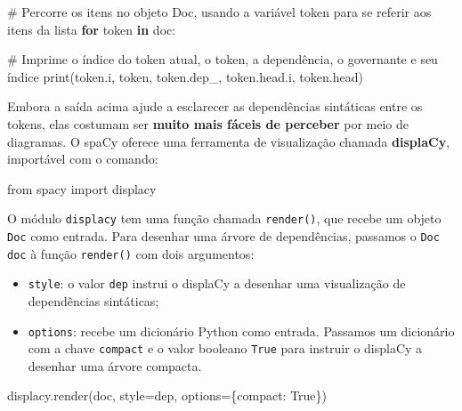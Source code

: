\documentclass[
  brazilian,
  11pt,
]{article}
\newenvironment{Shaded}{\begin{snugshade}}{\end{snugshade}}
\newcommand{\BuiltInTok}[1]{\textcolor[rgb]{0.50,0.55,0.55}{#1}}
\newcommand{\CommentTok}[1]{\textcolor[rgb]{0.48,0.49,0.49}{#1}}
\newcommand{\ControlFlowTok}[1]{\textcolor[rgb]{0.99,0.74,0.29}{\textbf{#1}}}
\newcommand{\ImportTok}[1]{\textcolor[rgb]{0.15,0.68,0.38}{#1}}
\newcommand{\KeywordTok}[1]{\textcolor[rgb]{0.81,0.81,0.76}{\textbf{#1}}}
\newcommand{\NormalTok}[1]{\textcolor[rgb]{0.81,0.81,0.76}{#1}}
\newcommand{\OperatorTok}[1]{\textcolor[rgb]{0.81,0.81,0.76}{#1}}
\newcommand{\StringTok}[1]{\textcolor[rgb]{0.96,0.31,0.31}{#1}}
\newcommand{\VariableTok}[1]{\textcolor[rgb]{0.15,0.68,0.68}{#1}}
\providecommand{\tightlist}{%
  \setlength{\itemsep}{0pt}\setlength{\parskip}{0pt}}
\let\oldtexttt\texttt
\renewcommand{\texttt}[1]{{\color{inlink}\oldtexttt{#1}}}
\begin{document}
\begin{Shaded}
\begin{Highlighting}[]
\CommentTok{\# Percorre os itens no objeto Doc, usando a variável \textquotesingle{}token\textquotesingle{} para se referir aos itens da lista}
\ControlFlowTok{for}\NormalTok{ token }\KeywordTok{in}\NormalTok{ doc:}

    \CommentTok{\# Imprime o índice do token atual, o token, a dependência, o governante e seu índice}
    \BuiltInTok{print}\NormalTok{(token.i, token, token.dep\_, token.head.i, token.head)}
\end{Highlighting}
\end{Shaded}

Embora a saída acima ajude a esclarecer as dependências sintáticas entre
os tokens, elas costumam ser \textbf{muito mais fáceis de perceber} por
meio de diagramas. O spaCy oferece uma ferramenta de visualização
chamada \textbf{displaCy}, importável com o comando:

\begin{Shaded}
\begin{Highlighting}[]
\ImportTok{from}\NormalTok{ spacy }\ImportTok{import}\NormalTok{ displacy}
\end{Highlighting}
\end{Shaded}

O módulo \texttt{displacy} tem uma função chamada \texttt{render()}, que
recebe um objeto \texttt{Doc} como entrada. Para desenhar uma árvore de
dependências, passamos o \texttt{Doc} \texttt{doc} à função
\texttt{render()} com dois argumentos:

\begin{itemize}
\tightlist
\item
  \texttt{style}: o valor
  \texttt{\textquotesingle{}dep\textquotesingle{}} instrui o displaCy a
  desenhar uma visualização de dependências sintáticas;
\item
  \texttt{options}: recebe um dicionário Python como entrada. Passamos
  um dicionário com a chave \texttt{compact} e o valor booleano
  \texttt{True} para instruir o displaCy a desenhar uma árvore compacta.
\end{itemize}

\begin{Shaded}
\begin{Highlighting}[]
\NormalTok{displacy.render(doc, style}\OperatorTok{=}\StringTok{\textquotesingle{}dep\textquotesingle{}}\NormalTok{, options}\OperatorTok{=}\NormalTok{\{}\StringTok{\textquotesingle{}compact\textquotesingle{}}\NormalTok{: }\VariableTok{True}\NormalTok{\})}
\end{Highlighting}
\end{Shaded}
\end{document}
